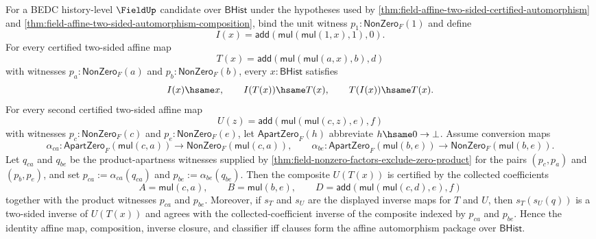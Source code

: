 \begin{theorem}
\label{thm:field-affine-automorphism-identity-and-inverse-package}
For a BEDC history-level $\FieldUp$ candidate over $\mathsf{BHist}$ under the
hypotheses used by
\autoref{thm:field-affine-two-sided-certified-automorphism} and
\autoref{thm:field-affine-two-sided-automorphism-composition}, bind the unit
witness $p_1:\mathsf{NonZero}_F(1)$ and define
$$
I(x)=\mathsf{add}(\mathsf{mul}(\mathsf{mul}(1,x),1),0).
$$
For every certified two-sided affine map
$$
T(x)=\mathsf{add}(\mathsf{mul}(\mathsf{mul}(a,x),b),d)
$$
with witnesses $p_a:\mathsf{NonZero}_F(a)$ and
$p_b:\mathsf{NonZero}_F(b)$, every $x:\mathsf{BHist}$ satisfies
$$
I(x)\hsame x,
\qquad
I(T(x))\hsame T(x),
\qquad
T(I(x))\hsame T(x).
$$
For every second certified two-sided affine map
$$
U(z)=\mathsf{add}(\mathsf{mul}(\mathsf{mul}(c,z),e),f)
$$
with witnesses $p_c:\mathsf{NonZero}_F(c)$ and
$p_e:\mathsf{NonZero}_F(e)$, let $\mathsf{ApartZero}_F(h)$ abbreviate
$h\hsame0\to\bot$. Assume conversion maps
$$
\alpha_{ca}:\mathsf{ApartZero}_F(\mathsf{mul}(c,a))\to
\mathsf{NonZero}_F(\mathsf{mul}(c,a)),
\qquad
\alpha_{be}:\mathsf{ApartZero}_F(\mathsf{mul}(b,e))\to
\mathsf{NonZero}_F(\mathsf{mul}(b,e)).
$$
Let $q_{ca}$ and $q_{be}$ be the product-apartness witnesses supplied by
\autoref{thm:field-nonzero-factors-exclude-zero-product} for the pairs
$(p_c,p_a)$ and $(p_b,p_e)$, and set
$p_{ca}:=\alpha_{ca}(q_{ca})$ and $p_{be}:=\alpha_{be}(q_{be})$. Then the
composite $U(T(x))$ is certified by the collected coefficients
$$
A=\mathsf{mul}(c,a),
\qquad
B=\mathsf{mul}(b,e),
\qquad
D=\mathsf{add}(\mathsf{mul}(\mathsf{mul}(c,d),e),f)
$$
together with the product witnesses $p_{ca}$ and $p_{be}$.
Moreover, if $s_T$ and $s_U$ are the displayed inverse maps for $T$ and $U$,
then $s_T(s_U(q))$ is a two-sided inverse of $U(T(x))$ and agrees with the
collected-coefficient inverse of the composite indexed by $p_{ca}$ and
$p_{be}$. Hence the identity affine map, composition, inverse closure, and
classifier iff clauses form the affine automorphism package over
$\mathsf{BHist}$.
\end{theorem}
